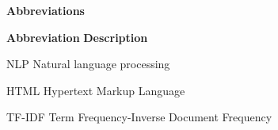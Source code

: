 

\begin{center}
\textbf{\large{Abbreviations}}
\end{center}
\vspace{1cm}
\begin{abbrv}
 

\item[\textbf{Abbreviation}] \hspace{2.25cm}\textbf{Description}
\item[NLP] \hspace{2cm}	Natural language processing
\item[HTML] \hspace{2cm}	Hypertext Markup Language
\item[TF-IDF ] \hspace{2cm}  Term Frequency-Inverse Document Frequency



 
\end{abbrv}